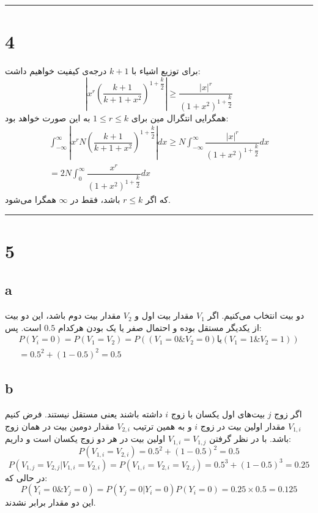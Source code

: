 \documentclass{article}
\begin{document}
\rule{\linewidth}{1pt}

\section*{4}
برای توزیع اشیاء با
$k+1$
درجه‌ی کیفیت خواهیم داشت:
$$\left| x^{r}\left( \dfrac{k+1}{k+1+x^{2}}\right) ^{1+\dfrac{k}{2}}\right| \geq \dfrac{\left| x\right| ^{r}}{\left( 1+x^{2}\right) ^{1+\dfrac{k}{2}}}$$
همگرایی انتگرال
مین
برای
$1 \leq r \leq k$
به این صورت خواهد بود:
$$\begin{aligned}\int ^{\infty }_{-\infty }\left| x^{r}N\left( \dfrac{k+1}{k+1+x^{2}}\right) ^{1+\dfrac{k}{2}}\right| dx\geq N\int _{-\infty }^{\infty }\dfrac{\left| x\right| ^{r}}{\left( 1+x^{2}\right) ^{1+\dfrac{k}{2}}}dx\\ =2N\int _{0}^{\infty }\dfrac{x^{r}}{\left( 1+x^{2}\right) ^{1+\dfrac{k}{2}}}dx\end{aligned}$$
که اگر
$r \leq k$
باشد، فقط در
$\infty$
همگرا می‌شود.

\rule{\linewidth}{1pt}
\section*{5}
\subsection*{a}
دو بیت انتخاب می‌کنیم. اگر
$V_1$
مقدار بیت اول و
$V_2$
مقدار بیت دوم باشد، این دو بیت از یکدیگر مستقل بوده و احتمال صفر یا یک بودن هرکدام
$0.5$
است. پس:
$$\begin{aligned}P\left( Y_{i}=0\right) =P\left( V_{1}=V_{2}\right) =P\left( (V_{1}=0\& V_{2}=0) \text{یا} (V_{1}=1\& V_{2}=1)\right) \\ =0.5^{2}+\left( 1-0.5\right) ^{2}=0.5\end{aligned}$$

\subsection*{b}
اگر زوج
$j$
بیت‌های اول یکسان با زوج
$i$
داشته باشند یعنی مستقل نیستند.
فرض کنیم
$V_{1,i}$
مقدار اولین بیت در زوج
$i$
و به همین ترتیب
$V_{2,i}$
مقدار دومین بیت در همان زوج باشد. با در نظر گرفتن
$V_{1,i} = V_{1,j}$
اولین بیت در هر دو زوج یکسان است و داریم:
$$P( V_{1,i}= V_{2,i}) =0.5^{2}+\left( 1-0.5\right) ^{2}=0.5$$
$$P( V_{1,j}= V_{2,j}| V_{1,i}= V_{2,i}) =P( V_{1,i}=V_{2,i}= V_{2,j}) =0.5^{3}+\left( 1-0.5\right) ^{3}=0.25$$
در حالی که:
$$P( Y_{i}=0\& Y_{j}= 0) =P( Y_{j}= 0| Y_{i}= 0) P( Y_{i}= 0) =0.25\times 0.5=0.125$$
این دو مقدار برابر نشدند.
\end{document}
